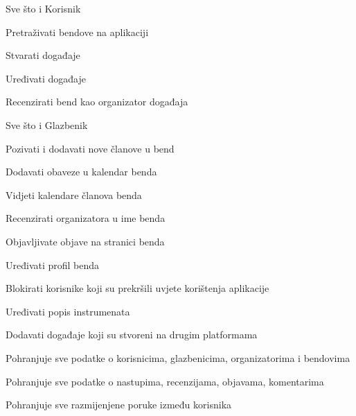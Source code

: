 \begin{packed_enum}
		\item  {}
			
			\begin{packed_enum}
				
				\item Sve što i Korisnik
				\item Pretraživati bendove na aplikaciji
				\item Stvarati događaje
				\item Uređivati događaje
				\item Recenzirati bend kao organizator događaja
			\end{packed_enum}
			
		\item  {}
			
			\begin{packed_enum}
				
				\item Sve što i Glazbenik
				\item Pozivati i dodavati nove članove u bend
				\item Dodavati obaveze u kalendar benda
				\item Vidjeti kalendare članova benda
				\item Recenzirati organizatora u ime benda
				\item Objavljivate objave na stranici benda
				\item Uređivati profil benda
			\end{packed_enum}
			
		\item  {}
			
			\begin{packed_enum}
				
				\item Blokirati korisnike koji su prekršili uvjete korištenja aplikacije
				\item Uređivati popis instrumenata
				\item Dodavati događaje koji su stvoreni na drugim platformama
				
			\end{packed_enum}
			
		\item  {}
			
			\begin{packed_enum}
				
				\item Pohranjuje sve podatke o korisnicima, glazbenicima, organizatorima i bendovima
				\item Pohranjuje sve podatke o nastupima, recenzijama, objavama, komentarima
				\item Pohranjuje sve razmijenjene poruke između korisnika 
				
			\end{packed_enum}
		
		\end{packed_enum}
			

